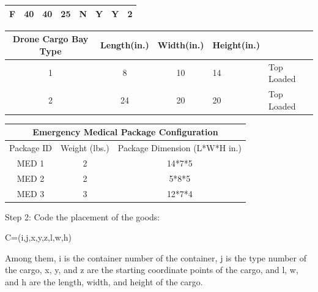 \documentclass{article} %
\begin{document}
\begin{table}[htp]
\begin{tabular}{|c|c|c|c|c|c|c|c|}
    F     & 40                                                     & 40                                                    & 25                                                     & N                                                                          & Y                                                       & Y                                                         & 2                                                                 \\ \hline
    \end{tabular}
    \end{table}

\begin{table}[htp]
    \begin{tabular}{|c|c|c|l|l|}
    \hline
Drone Cargo Bay Type & Length(in.) & Width(in.) & Height(in.) &            \\ \hline
    1                    & 8           & 10         & 14          & Top Loaded \\ \hline
    2                    & 24          & 20         & 20          & Top Loaded \\ \hline
    \end{tabular}
    \end{table}
\begin{center}
    \begin{table}[htp]
        \begin{tabular}{|c|c|c|}
        \hline
\multicolumn{3}{|c|}{Emergency Medical Package Configuration} \\ \hline
        Package ID  & Weight (lbs.) & Package Dimension (L*W*H   in.)  \\ \hline
        MED 1       & 2             & 14*7*5                          \\ \hline
        MED 2       & 2             & 5*8*5                           \\ \hline
        MED 3       & 3             & 12*7*4                          \\ \hline
        \end{tabular}
    \end{table}
    \end{center}
Step 2: Code the placement of the goods:

\centerline{C=(i,j,x,y,z,l,w,h)}

Among them, i is the container number of the container, j is the type number of the cargo, x, y, and z are the starting coordinate points of the cargo, and l, w, and h are the length, width, and height of the cargo.
\end{document}
